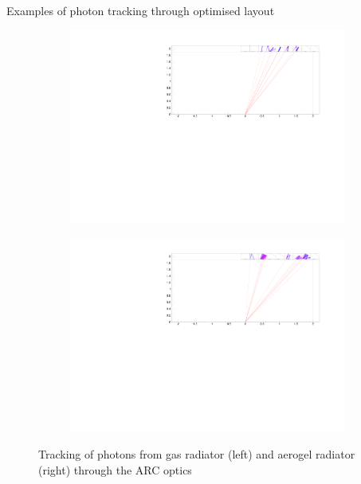 \documentclass{beamer}
\begin{document}
\begin{frame}{Examples of photon tracking through optimised layout}
  \begin{figure}
    \centering
    \begin{subfigure}{0.45\textwidth}
      \includegraphics[width = 1.0\textwidth, trim = {11cm 5cm 3.5cm 0}, clip = true]{Plots/EventDisplay_MainRow.pdf}
    \end{subfigure}%
    \hspace{0.2cm}
    \begin{subfigure}{0.45\textwidth}
      \includegraphics[width = 1.0\textwidth, trim = {11.6cm 5cm 2.9cm 0}, clip = true]{Plots/EventDisplay_MainRow_Aerogel.pdf}
    \end{subfigure}
    \caption{Tracking of photons from gas radiator (left) and aerogel radiator (right) through the ARC optics}

\end{figure}
\end{frame}
\end{document}
